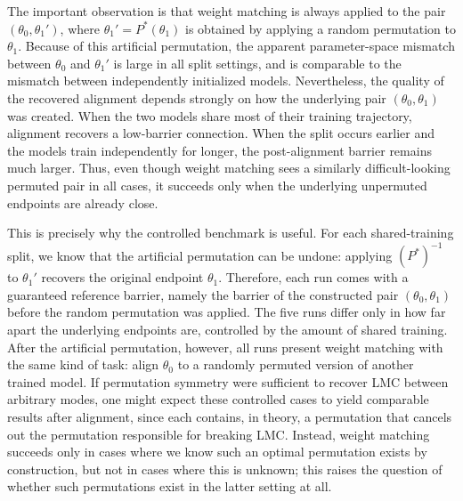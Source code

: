 \documentclass[11pt,a4paper]{report}
\begin{document}
The important observation is that weight matching is always applied to the pair $(\theta_0,\theta_1')$, where $\theta_1' = P^\ast(\theta_1)$ is obtained by applying a random permutation to $\theta_1$. Because of this artificial permutation, the apparent parameter-space mismatch between $\theta_0$ and $\theta_1'$ is large in all split settings, and is comparable to the mismatch between independently initialized models. Nevertheless, the quality of the recovered alignment depends strongly on how the underlying pair $(\theta_0,\theta_1)$ was created. When the two models share most of their training trajectory, alignment recovers a low-barrier connection. When the split occurs earlier and the models train independently for longer, the post-alignment barrier remains much larger. Thus, even though weight matching sees a similarly difficult-looking permuted pair in all cases, it succeeds only when the underlying unpermuted endpoints are already close.

This is precisely why the controlled benchmark is useful. For each shared-training split, we know that the artificial permutation can be undone: applying $(P^\ast)^{-1}$ to $\theta_1'$ recovers the original endpoint $\theta_1$. Therefore, each run comes with a guaranteed reference barrier, namely the barrier of the constructed pair $(\theta_0,\theta_1)$ before the random permutation was applied. The five runs differ only in how far apart the underlying endpoints are, controlled by the amount of shared training. After the artificial permutation, however, all runs present weight matching with the same kind of task: align $\theta_0$ to a randomly permuted version of another trained model. If permutation symmetry were sufficient to recover LMC between arbitrary modes, one might expect these controlled cases to yield comparable results after alignment, since each contains, in theory, a permutation that cancels out the permutation responsible for breaking LMC. Instead, weight matching succeeds only in cases where we know such an optimal permutation exists by construction, but not in cases where this is unknown; this raises the question of whether such permutations exist in the latter setting at all.
\end{document}

